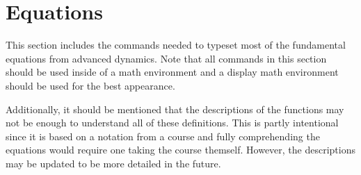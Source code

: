 \section{Equations}
\label{sec:eqs}
This section includes the commands needed to typeset most of the fundamental equations from advanced dynamics. Note that all commands in this section should be used inside of a math environment and a display math environment should be used for the best appearance.

Additionally, it should be mentioned that the descriptions of the functions may not be enough to understand all of these definitions. This is partly intentional since it is based on a notation from a course and fully comprehending the equations would require one taking the course themself. However, the descriptions may be updated to be more detailed in the future.

\subsection*{}
\label{sec:newtonII}


\newpage


